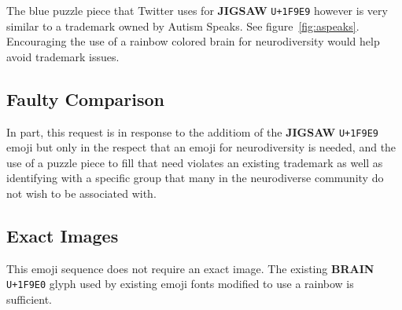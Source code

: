 The blue puzzle piece that Twitter uses for \textbf{JIGSAW} \texttt{U+1F9E9} however is very
similar to a trademark owned by Autism Speaks. See figure~\ref{fig:aspeaks}. Encouraging the
use of a rainbow colored brain for neurodiversity would help avoid trademark issues.

\subsection{Faulty Comparison}

In part, this request is in response to the additiom of the \textbf{JIGSAW} \texttt{U+1F9E9}
emoji but only in the respect that an emoji for neurodiversity is needed, and the use of a
puzzle piece to fill that need violates an existing trademark as well as identifying with a
specific group that many in the neurodiverse community do not wish to be associated with.

\subsection{Exact Images}

This emoji sequence does not require an exact image. The existing \textbf{BRAIN} \texttt{U+1F9E0}
glyph used by existing emoji fonts modified to use a rainbow is sufficient.
